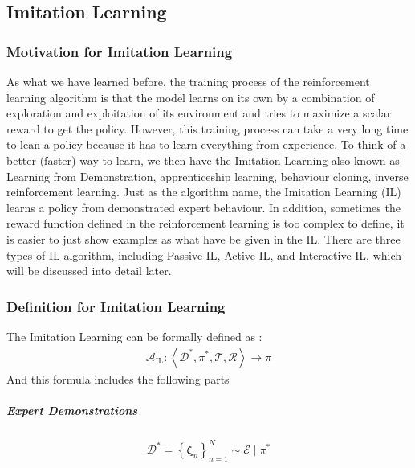 \documentclass[11pt]{article}
\begin{document}
\subsection{Imitation Learning}
\subsubsection{Motivation for Imitation Learning}
\normalfont
As what we have learned before, the training process of the reinforcement learning algorithm is that the model learns on its own by a combination of exploration and exploitation of its environment and tries to maximize a scalar reward to get the policy. However, this training process can take a very long time to lean a policy because it has to learn everything from experience. To think of a better (faster) way to learn, we then have the Imitation Learning also known as Learning from Demonstration, apprenticeship learning, behaviour cloning, inverse reinforcement learning. Just as the algorithm name, the Imitation Learning (IL) learns a policy from demonstrated expert behaviour. In addition, sometimes the reward function defined in the reinforcement learning is too complex to define, it is easier to just show examples as what have be given in the IL. There are three types of IL algorithm, including Passive IL, Active IL, and Interactive IL, which will be discussed into detail later.
\subsubsection{Definition for Imitation Learning}
\normalfont
The Imitation Learning can be formally defined as : 
\begin{align}
    \mathcal{A}_{\mathrm{IL}}:\left\langle\mathcal{D}^{*}, \pi^{*}, \mathcal{T}, \mathcal{R}\right\rangle \rightarrow \pi
\end{align}
And this formula includes the following parts
\subparagraph{Expert Demonstrations}
\begin{align}
    \mathcal{D}^{*}=\left\{\boldsymbol{\zeta}_{n}\right\}_{n=1}^{N} \sim \mathcal{E} \mid \pi^{*}
\end{align}
\normalfont
\end{document}
